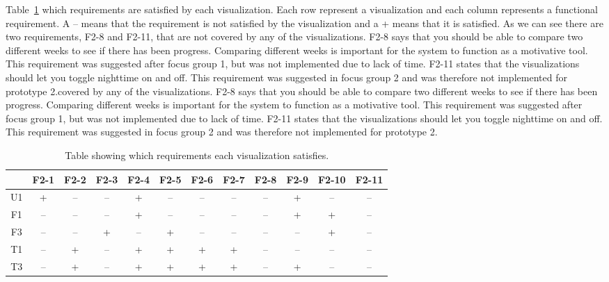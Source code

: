 Table~\ref{tab:reqSat} which requirements are satisfied by each visualization. Each row represent a visualization and each column represents a functional requirement. A -- means that the requirement is not satisfied by the visualization and a + means that it is satisfied. As we can see there are two requirements, F2-8 and F2-11, that are not covered by any of the visualizations. F2-8 says that you should be able to compare two different weeks to see if there has been progress. Comparing different weeks is important for the system to function as a motivative tool. This requirement was suggested after focus group 1, but was not implemented due to lack of time. F2-11 states that the visualizations should let you toggle nighttime on and off. This requirement was suggested in focus group 2 and was therefore not implemented for prototype 2.covered by any of the visualizations. F2-8 says that you should be able to compare two different weeks to see if there has been progress. Comparing different weeks is important for the system to function as a motivative tool. This requirement was suggested after focus group 1, but was not implemented due to lack of time. F2-11 states that the visualizations should let you toggle nighttime on and off. This requirement was suggested in focus group 2 and was therefore not implemented for prototype 2.

\begin{table}[h!]
  \centering
  \begin{tabular}{|c|c|c|c|c|c|c|c|c|c|c|c|}
    \hline
    & F2-1 & F2-2 & F2-3 & F2-4 & F2-5 & F2-6 & F2-7 & F2-8 & F2-9 & F2-10 & F2-11 \\ \hline
    U1 & + & -- & -- & + & -- & -- & -- & -- & + & -- & -- \\ \hline
    F1 & -- & -- & -- & + & -- & -- & -- & -- & + & + & -- \\ \hline
    F3 & -- & -- & + & -- & + & -- & -- & -- & -- & + & -- \\ \hline
    T1 & -- & + & -- & + & + & + & + & -- & -- & -- & -- \\ \hline
    T3 & -- & + & -- & + & + & + & + & -- & + & -- & -- \\ \hline
  \end{tabular}
  \caption{Table showing which requirements each visualization satisfies.}
  \label{tab:reqSat}
\end{table}

